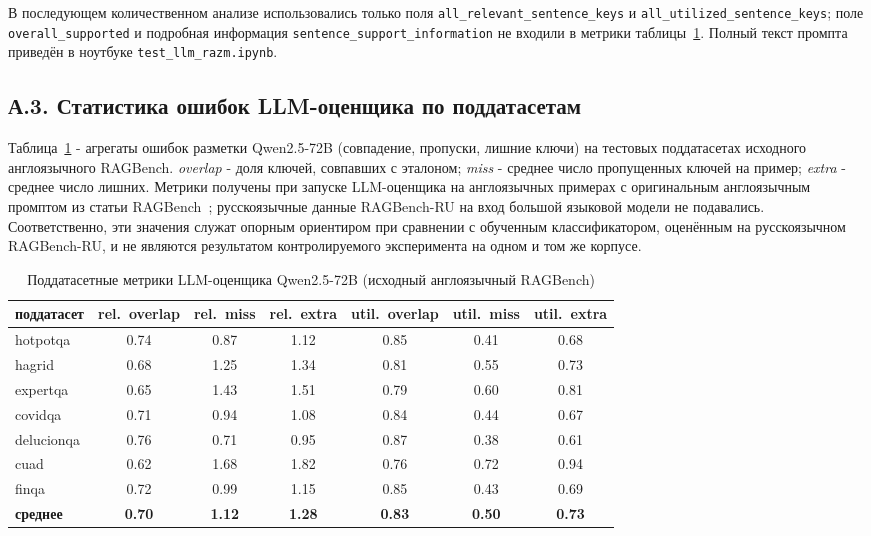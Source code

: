 В последующем количественном анализе использовались только поля
\texttt{all\_relevant\_sentence\_keys} и
\texttt{all\_utilized\_sentence\_keys}; поле
\texttt{overall\_supported} и подробная информация
\texttt{sentence\_support\_information} не входили в метрики
таблицы~\ref{tab:llm_errors}. Полный текст промпта приведён в ноутбуке
\texttt{test\_llm\_razm.ipynb}.


\subsection*{А.3. Статистика ошибок LLM-оценщика по поддатасетам}

Таблица~\ref{tab:llm_errors} - агрегаты ошибок разметки Qwen2.5-72B
(совпадение, пропуски, лишние ключи) на тестовых поддатасетах исходного
англоязычного RAGBench. \emph{overlap} - доля ключей, совпавших с эталоном;
\emph{miss} - среднее число пропущенных ключей на пример; \emph{extra} -
среднее число лишних. Метрики получены при запуске LLM-оценщика на
англоязычных примерах с оригинальным англоязычным промптом из статьи
RAGBench~\cite{friel2024ragbench}; русскоязычные данные RAGBench-RU на вход
большой языковой модели не подавались. Соответственно, эти значения служат
опорным ориентиром при сравнении с обученным классификатором, оценённым на
русскоязычном RAGBench-RU, и не являются результатом контролируемого
эксперимента на одном и том же корпусе.

\begin{table}[H]
\centering
\small
\caption{Поддатасетные метрики LLM-оценщика Qwen2.5-72B (исходный англоязычный RAGBench)}
\label{tab:llm_errors}
\begin{tabular}{lcccccc}
\toprule
поддатасет & rel.~overlap & rel.~miss & rel.~extra & util.~overlap & 
util.~miss & util.~extra \\
\midrule
hotpotqa   & 0.74 & 0.87 & 1.12 & 0.85 & 0.41 & 0.68 \\
hagrid     & 0.68 & 1.25 & 1.34 & 0.81 & 0.55 & 0.73 \\
expertqa   & 0.65 & 1.43 & 1.51 & 0.79 & 0.60 & 0.81 \\
covidqa    & 0.71 & 0.94 & 1.08 & 0.84 & 0.44 & 0.67 \\
delucionqa & 0.76 & 0.71 & 0.95 & 0.87 & 0.38 & 0.61 \\
cuad       & 0.62 & 1.68 & 1.82 & 0.76 & 0.72 & 0.94 \\
finqa      & 0.72 & 0.99 & 1.15 & 0.85 & 0.43 & 0.69 \\
\midrule
\textbf{среднее} & \textbf{0.70} & \textbf{1.12} & \textbf{1.28} & \textbf{0.83}
 & \textbf{0.50} & \textbf{0.73} \\
\bottomrule
\end{tabular}
\end{table}

